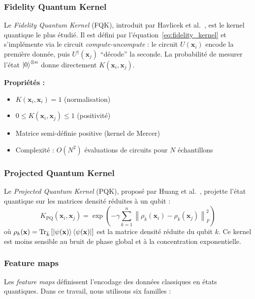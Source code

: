 \documentclass[12pt,a4paper]{article}
\newcommand{\x}{\mathbf{x}}
\begin{document}
\subsubsection{Fidelity Quantum Kernel}

Le \textit{Fidelity Quantum Kernel} (FQK), introduit par Havlicek et al.~\cite{havlicek2019}, est le kernel quantique le plus étudié. Il est défini par l'équation~\eqref{eq:fidelity_kernel} et s'implémente via le circuit \textit{compute-uncompute} : le circuit $U(\x_i)$ encode la première donnée, puis $U^\dagger(\x_j)$ ``décode'' la seconde. La probabilité de mesurer l'état $\ket{0}^{\otimes n}$ donne directement $K(\x_i, \x_j)$.

\textbf{Propriétés :}
\begin{itemize}[noitemsep]
    \item $K(\x_i, \x_i) = 1$ (normalisation)
    \item $0 \leq K(\x_i, \x_j) \leq 1$ (positivité)
    \item Matrice semi-définie positive (kernel de Mercer)
    \item Complexité : $O(N^2)$ évaluations de circuits pour $N$ échantillons
\end{itemize}

\subsubsection{Projected Quantum Kernel}

Le \textit{Projected Quantum Kernel} (PQK), proposé par Huang et al.~\cite{huang2021}, projette l'état quantique sur les matrices densité réduites à un qubit :
\begin{equation}
K_{\text{PQ}}(\x_i, \x_j) = \exp\left(-\gamma \sum_{k=1}^{n} \left\| \rho_k(\x_i) - \rho_k(\x_j) \right\|_F^2 \right)
\label{eq:pqk}
\end{equation}
où $\rho_k(\x) = \text{Tr}_{\bar{k}}\left[\ket{\psi(\x)}\bra{\psi(\x)}\right]$ est la matrice densité réduite du qubit $k$. Ce kernel est moins sensible au bruit de phase global et à la concentration exponentielle.

\subsubsection{Feature maps}

Les \textit{feature maps} définissent l'encodage des données classiques en états quantiques. Dans ce travail, nous utilisons six familles :
\end{document}

